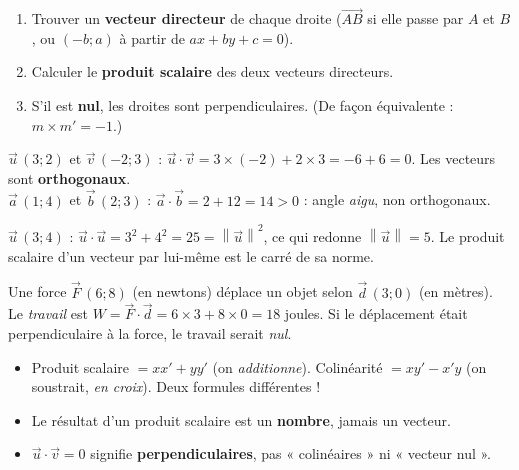 \documentclass[11pt,a4paper]{article}
\newcommand{\vc}[1]{\overrightarrow{#1}}
\providecommand{\norm}[1]{\left\lVert #1\right\rVert}
\begin{document}
\begin{methode}
\begin{enumerate}[leftmargin=1.7em,topsep=2pt,itemsep=2pt]
  \item Trouver un \textbf{vecteur directeur} de chaque droite ($\vc{AB}$ si elle passe par $A$ et $B$,
        ou $(-b;a)$ à partir de $ax+by+c=0$).
  \item Calculer le \textbf{produit scalaire} des deux vecteurs directeurs.
  \item S'il est \textbf{nul}, les droites sont perpendiculaires. (De façon équivalente : $m\times m'=-1$.)
\end{enumerate}
\end{methode}

\begin{exemple}
$\vec u\,(3;2)$ et $\vec v\,(-2;3)$ : $\vec u\cdot\vec v=3\times(-2)+2\times3=-6+6=0$. Les vecteurs sont
\textbf{orthogonaux}.\\
$\vec a\,(1;4)$ et $\vec b\,(2;3)$ : $\vec a\cdot\vec b=2+12=14>0$ : angle \emph{aigu}, non orthogonaux.
\end{exemple}

\begin{exemple}
$\vec u\,(3;4)$ : $\vec u\cdot\vec u=3^2+4^2=25=\norm{\vec u}^2$, ce qui redonne $\norm{\vec u}=5$.
Le produit scalaire d'un vecteur par lui-même est le carré de sa norme.
\end{exemple}

\begin{exemple}
Une force $\vec F\,(6;8)$ (en newtons) déplace un objet selon $\vec d\,(3;0)$ (en mètres). Le
\emph{travail} est $W=\vec F\cdot\vec d=6\times3+8\times0=18$ joules. Si le déplacement était
perpendiculaire à la force, le travail serait \emph{nul}.
\end{exemple}

\begin{piege}
\begin{itemize}[leftmargin=1.5em,topsep=2pt,itemsep=1pt]
  \item Produit scalaire $=xx'+yy'$ (on \emph{additionne}). Colinéarité $=xy'-x'y$ (on soustrait,
        \emph{en croix}). Deux formules différentes !
  \item Le résultat d'un produit scalaire est un \textbf{nombre}, jamais un vecteur.
  \item $\vec u\cdot\vec v=0$ signifie \textbf{perpendiculaires}, pas « colinéaires » ni « vecteur nul ».
\end{itemize}
\end{piege}
\end{document}
